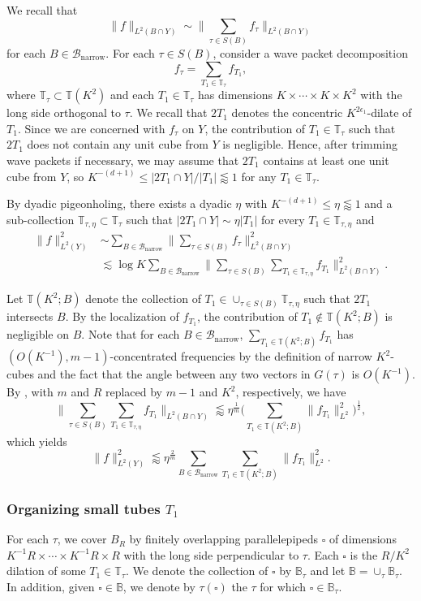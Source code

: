 \documentclass[11pt]{amsart}
\theoremstyle{definition}
\theoremstyle{remark}
\numberwithin{equation}{section}
\newcommand{\bB}{\mathbb{B}}
\newcommand{\T}{\mathbb{T}}
\newcommand{\sq}{\square}
\newcommand{\Bn}{\mathcal{B}_{\operatorname{narrow}}}
\newcommand{\les}{\lesssim}
\newcommand{\less}{\lessapprox}
\newcommand{\eps}{\epsilon}
\begin{document}
We recall that \[ \| f\|_{L^2(B\cap Y)} \sim \| \sum_{\tau\in S(B)} f_\tau \|_{L^2(B\cap Y)}\] for each $B\in \Bn$. For each $\tau\in S(B)$, consider a wave packet decomposition
\[ f_\tau = \sum_{T_1 \in \T_{\tau}} f_{T_1},\]
where $\T_{\tau} \subset \T(K^2)$ and each $T_1\in \T_{\tau}$ has dimensions $K\times \cdots \times K \times K^2$ with the long side orthogonal to $\tau$. We recall that $2T_1$ denotes the concentric  $K^{2\eps_1}$-dilate of $T_1$. Since we are concerned with $f_\tau$ on $Y$, the contribution of $T_1\in \T_\tau$ such that $2T_1$ does not contain any unit cube from $Y$ is negligible. Hence, after trimming wave packets if necessary, we may assume that $2T_1$ contains at least one unit cube from $Y$, so  $K^{-(d+1)} \leq |2T_1\cap Y| / |T_1| \less 1$ for any $T_1\in \T_\tau$. 

By dyadic pigeonholing, there exists a dyadic $\eta$ with $K^{-(d+1)} \leq \eta \less 1$ and a sub-collection $\T_{\tau,\eta} \subset \T_\tau$ such that $|2T_1 \cap Y| \sim \eta |T_1|$ for every $T_1\in \T_{\tau,\eta}$ and 
\begin{align*}
	\|f\|_{L^2(Y)}^2 &\sim  \sum_{B\in \Bn} \| \sum_{\tau\in S(B)} f_\tau \|_{L^2(B\cap Y)}^2 \\
	&\les \log K \sum_{B\in \Bn}\| \sum_{\tau\in S(B)} \sum_{T_1 \in \T_{\tau,\eta}} f_{T_1} \|_{L^2(B\cap Y)}^2.
\end{align*}

Let $\T(K^2;B)$ denote the collection of $T_1\in \cup_{\tau\in S(B)} \T_{\tau,\eta}$ such that $2T_1$ intersects $B$. 
By the localization of $f_{T_1}$, the contribution of $T_1\notin \T(K^2;B)$ is negligible on $B$. Note that for each  $B\in \Bn$, $\sum_{T_1 \in \T(K^2;B)} f_{T_1}$ has $(O(K^{-1}),m-1)$-concentrated frequencies by the definition of narrow $K^2$-cubes and the fact that the angle between any two vectors in $G(\tau)$ is $O(K^{-1})$. By , with $m$ and $R$ replaced by $m-1$ and $K^2$, respectively, we have 
\[
\| \sum_{\tau\in S(B)} \sum_{T_1 \in \T_{\tau,\eta}} f_{T_1}\|_{L^2(B\cap Y)} \less \eta^{\frac{1}{m}}  \Big(    \sum_{T_1 \in \T(K^2;B)}  \|  f_{T_1} \|_{L^2}^2 \Big)^{\frac{1}{2}},
\]
which yields 
\begin{equation}\label{eqn:mainb}
	\| f\|_{L^2(Y)}^2 \less \eta^{\frac{2}{m}} \sum_{B\in \Bn}\sum_{T_1 \in \T(K^2;B)} \|  f_{T_1} \|_{L^2}^2. 
\end{equation}

\subsubsection{Organizing small tubes $T_1$}
For each $\tau$, we cover $B_R$ by finitely overlapping parallelepipeds $\sq$ of dimensions $K^{-1}R \times \cdots \times K^{-1}R  \times R$ with the long side perpendicular to $\tau$. Each $\sq$ is the $R/K^{2}$ dilation of some $T_1 \in \T_\tau$. We denote the collection of $\sq$ by $\bB_\tau$ and let $\bB = \cup_\tau \bB_\tau$.  In addition, given $\sq \in  \bB$, we denote by $\tau(\sq)$ the $\tau$ for which $\sq\in \bB_\tau$. 
\end{document}
